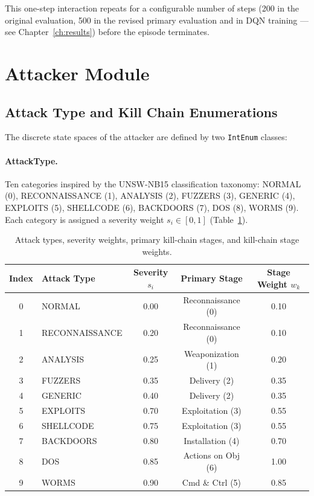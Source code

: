 This one-step interaction repeats for a configurable number of steps
(200 in the original evaluation, 500 in the revised primary evaluation and
in DQN training — see Chapter~\ref{ch:results}) before the episode terminates.

\section{Attacker Module}
\label{sec:attacker}

\subsection{Attack Type and Kill Chain Enumerations}

The discrete state spaces of the attacker are defined by two \texttt{IntEnum}
classes:

\paragraph{AttackType.}
Ten categories inspired by the UNSW-NB15 classification taxonomy:
NORMAL (0), RECONNAISSANCE (1), ANALYSIS (2), FUZZERS (3), GENERIC (4),
EXPLOITS (5), SHELLCODE (6), BACKDOORS (7), DOS (8), WORMS (9).
Each category is assigned a severity weight $s_i \in [0, 1]$
(Table~\ref{tab:attack_severity_meth}).

\begin{table}[ht]
  \centering
  \caption{Attack types, severity weights, primary kill-chain stages,
           and kill-chain stage weights.}
  \label{tab:attack_severity_meth}
  \begin{tabular}{clccc}
    \toprule
    Index & Attack Type & Severity $s_i$ & Primary Stage & Stage Weight $w_k$ \\
    \midrule
    0 & NORMAL        & 0.00 & Reconnaissance (0) & 0.10 \\
    1 & RECONNAISSANCE & 0.20 & Reconnaissance (0) & 0.10 \\
    2 & ANALYSIS      & 0.25 & Weaponization (1)  & 0.20 \\
    3 & FUZZERS       & 0.35 & Delivery (2)       & 0.35 \\
    4 & GENERIC       & 0.40 & Delivery (2)       & 0.35 \\
    5 & EXPLOITS      & 0.70 & Exploitation (3)   & 0.55 \\
    6 & SHELLCODE     & 0.75 & Exploitation (3)   & 0.55 \\
    7 & BACKDOORS     & 0.80 & Installation (4)   & 0.70 \\
    8 & DOS           & 0.85 & Actions on Obj (6) & 1.00 \\
    9 & WORMS         & 0.90 & Cmd \& Ctrl (5)    & 0.85 \\
    \bottomrule
  \end{tabular}
\end{table}

